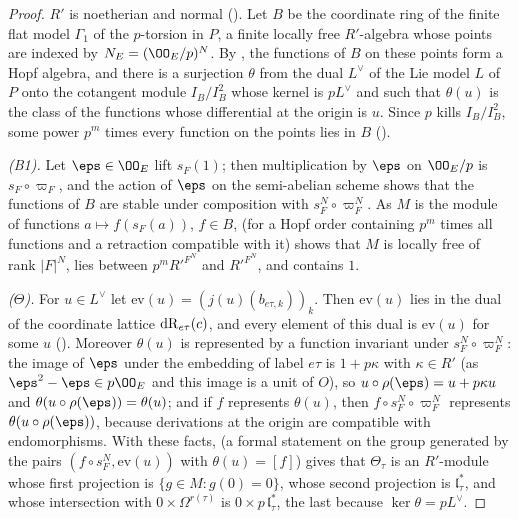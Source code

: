 \begin{proof}
$R'$ is noetherian and normal (). Let
$B$ be the coordinate ring of the finite flat model $\Gamma_1$ of the $p$-torsion in $P$, a finite locally free $R'$-algebra whose
points are indexed by $N_E=(\OO_E/p)^N$. By , the functions of $B$ on
these points form a Hopf algebra, and there is a surjection $\theta$ from the dual $L^\vee$ of the Lie model $L$ of $P$ onto the
cotangent module $I_B/I_B^2$ whose kernel is $pL^\vee$ and such that $\theta(u)$ is the class of the functions whose differential
at the origin is $u$. Since $p$ kills $I_B/I_B^2$, some power $p^m$ times every function on the points lies in $B$
().

\emph{(B1).} Let $\eps\in\OO_E$ lift $s_F(1)$; then multiplication by $\eps$ on $\OO_E/p$ is $s_F\circ\varpi_F$, and the action of
$\eps$ on the semi-abelian scheme shows that the functions of $B$ are stable under composition with $s_F^N\circ\varpi_F^N$. As
$M$ is the module of functions $a\mapsto f(s_F(a))$, $f\in B$, 
(for a Hopf order containing $p^m$ times all functions and a retraction compatible with it) shows that $M$ is locally free of
rank $|F|^N$, lies between $p^mR'^{F^N}$ and $R'^{F^N}$, and contains $1$.

\emph{($\Theta$).} For $u\in L^\vee$ let $\mathrm{ev}(u)=(j(u)(b_{e\tau,k}))_k$. Then $\mathrm{ev}(u)$ lies in the dual of the
coordinate lattice $\mathrm{dR}_{e\tau}(c)$, and every element of this dual is $\mathrm{ev}(u)$ for some $u$
(). Moreover $\theta(u)$ is represented by a function invariant
under $s_F^N\circ\varpi_F^N$: the image of $\eps$ under the embedding of label $e\tau$ is $1+p\kappa$ with $\kappa\in R'$ (as
$\eps^2-\eps\in p\OO_E$ and this image is a unit of $O$), so $u\circ\rho(\eps)=u+p\kappa u$ and
$\theta(u\circ\rho(\eps))=\theta(u)$; and if $f$ represents $\theta(u)$, then $f\circ s_F^N\circ\varpi_F^N$ represents
$\theta(u\circ\rho(\eps))$, because derivations at the origin are compatible with endomorphisms. With these facts,
 (a formal statement on the group generated by the pairs
$(f\circ s_F^N,\mathrm{ev}(u))$ with $\theta(u)=[f]$) gives that $\Theta_\tau$ is an $R'$-module whose first projection is
$\{g\in M:g(0)=0\}$, whose second projection is $\mathfrak l_\tau^*$, and whose intersection with $0\times\Omega^{r(\tau)}$ is
$0\times p\,\mathfrak l_\tau^*$, the last because $\ker\theta=pL^\vee$.
\end{proof}

